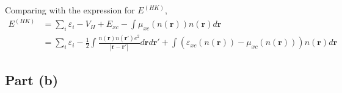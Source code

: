 \documentclass{article}
\begin{document}
Comparing with the expression for $E^{(H\!K)}$,
\begin{align*}
E^{(H\!K)}&=\sum_i\varepsilon_i-V_H+E_{xc}-\int\mu_{xc}(n(\mathbf{r}))n(\mathbf{r})d\mathbf{r}\\
&=\sum_i\varepsilon_i-\frac{1}{2}\int\frac{n(\mathbf{r})n(\mathbf{r}')e^2}{|\mathbf{r}-\mathbf{r}'|}d\mathbf{r}d\mathbf{r}'+\int(\varepsilon_{xc}(n(\mathbf{r}))-\mu_{xc}(n(\mathbf{r})))n(\mathbf{r})d\mathbf{r}
\end{align*}

\subsection{Part (b)}
\end{document}
